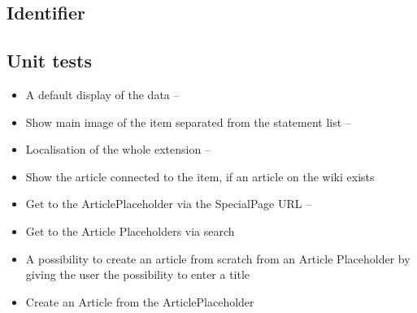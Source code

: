 \documentclass[11pt]{article}
\begin{document}
\subsection {Identifier}

\subsection {Unit tests}



\begin{itemize}
\item A default display of the data -- 
\item Show main image of the item separated from the statement list -- 
\item Localisation of the whole extension -- 
\item Show the article connected to the item, if an article on the wiki exists
\item Get to the ArticlePlaceholder via the SpecialPage URL --
\item Get to the Article Placeholders via search
\item A possibility to create an article from scratch from an Article Placeholder by giving the user the possibility to enter a title

\item Create an Article from the ArticlePlaceholder
\end{itemize} 
 
\end{document}
